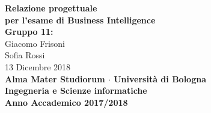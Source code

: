 \documentclass[12pt,a4paper]{article}
\begin{document}
\begin{titlepage}
\begin{center}
\vspace*{30mm}
{\Large{\textbf{Relazione progettuale\\per l'esame di Business Intelligence}}}\\
\vspace{20mm}
{\Large{
\textbf{Gruppo 11:}\\
Giacomo Frisoni\\
Sofia Rossi\\
}}
\vspace{10mm}
{\large{13 Dicembre 2018}}\\
\vspace{20mm}
{\large{\textbf{Alma Mater Studiorum $\cdot$ Universit\`a di Bologna}}}\\
\vspace{1mm}
{\large{\bf Ingegneria e Scienze informatiche}}\\
\vspace{1mm}
{\large{\bf Anno Accademico 2017/2018}}
\vspace*{\fill}
\end{center}
\end{titlepage}
\end{document}
